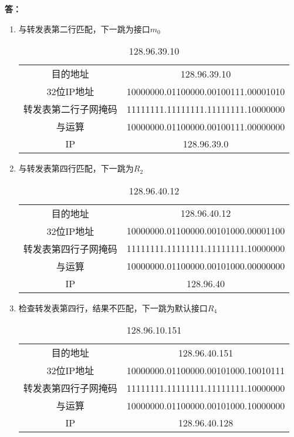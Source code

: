 \documentclass[12pt,hyperref,a4paper,UTF8]{ctexart}
\begin{document}
\textbf{答：}
\begin{enumerate}[label=(\arabic*),leftmargin=2.2\parindent]
    \item 与转发表第二行匹配，下一跳为接口$m_0$
    \begin{table}[H]
        \centering
        \begin{tabular}{c|c}
            \toprule
            目的地址 & 128.96.39.10\\
            32位IP地址 & 10000000.01100000.00100111.00001010\\ 
            转发表第二行子网掩码 & 11111111.11111111.11111111.10000000\\
            与运算 & 10000000.01100000.00100111.00000000\\
            IP & 128.96.39.0\\
            \bottomrule
        \end{tabular}
        \caption{128.96.39.10}\label{128.96.39.10}
    \end{table}

    \newpage
    \item 与转发表第四行匹配，下一跳为$R_2$
    \begin{table}[H]
        \centering
        \begin{tabular}{c|c}
            \toprule
            目的地址 & 128.96.40.12\\
            32位IP地址 & 10000000.01100000.00101000.00001100\\
            转发表第四行子网掩码 & 11111111.11111111.11111111.10000000\\
            与运算 & 10000000.01100000.00101000.00000000\\
            IP & 128.96.40\\
            \bottomrule
        \end{tabular}
        \caption{128.96.40.12}\label{128.96.40.12}
    \end{table}

    \item 检查转发表第四行，结果不匹配，下一跳为默认接口$R_4$
    \begin{table}[H]
        \centering
        \begin{tabular}{c|c}
            \toprule
            目的地址 & 128.96.40.151\\
            32位IP地址 & 10000000.01100000.00101000.10010111\\
            转发表第四行子网掩码 & 11111111.11111111.11111111.10000000\\
            与运算 & 10000000.01100000.00101000.10000000\\
            IP & 128.96.40.128\\
            \bottomrule
        \end{tabular}
        \caption{128.96.10.151}\label{128.96.40.151}
    \end{table}


\end{enumerate}
\end{document}
